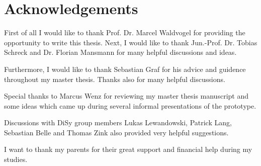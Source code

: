 \chapter*{Acknowledgements}
\thispagestyle{empty}
First of all I would like to thank Prof. Dr. Marcel Waldvogel for providing the opportunity to write this thesis. Next, I would like to thank Jun.-Prof. Dr. Tobias Schreck and Dr. Florian Mansmann for many helpful discussions and ideas.

Furthermore, I would like to thank Sebastian Graf for his advice and guidence throughout my master thesis. Thanks also for many helpful discussions. 

Special thanks to Marcus Wenz for reviewing my master thesis manuscript and some ideas which came up during several informal presentations of the prototype.

Discussions with DiSy group members Lukas Lewandowski, Patrick Lang, Sebastian Belle and Thomas Zink also provided very helpful suggestions.

I want to thank my parents for their great support and financial help during my studies.
\clearpage
